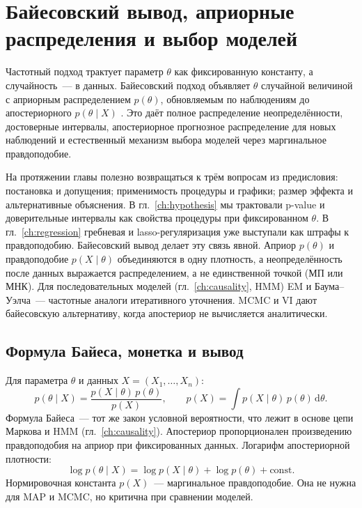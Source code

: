 \chapter{Байесовский вывод, априорные распределения и выбор моделей}
\label{ch:bayes}

Частотный подход трактует параметр $\theta$ как фиксированную константу, а случайность~--- в данных.
Байесовский подход объявляет $\theta$ случайной величиной с априорным распределением $p(\theta)$, обновляемым по наблюдениям до апостериорного $p(\theta\mid X)$ \citep{gelman2013,wasserman2004}.
Это даёт полное распределение неопределённости, достоверные интервалы, апостериорное прогнозное распределение для новых наблюдений и естественный механизм выбора моделей через маргинальное правдоподобие.


На протяжении главы полезно возвращаться к трём вопросам из предисловия: постановка и допущения; применимость процедуры и графики; размер эффекта и альтернативные объяснения. 
В гл.~\ref{ch:hypothesis} мы трактовали p-value и доверительные интервалы как свойства процедуры при фиксированном $\theta$. В гл.~\ref{ch:regression} гребневая и lasso-регуляризация уже выступали как штрафы к правдоподобию.
Байесовский вывод делает эту связь явной. Априор $p(\theta)$ и правдоподобие $p(X\mid\theta)$ объединяются в одну плотность, а неопределённость после данных выражается распределением, а не единственной точкой (МП или МНК).
Для последовательных моделей (гл.~\ref{ch:causality}, HMM) EM и Баума--Уэлча~--- частотные аналоги итеративного уточнения. MCMC и VI дают байесовскую альтернативу, когда апостериор не вычисляется аналитически.

\section{Формула Байеса, монетка и вывод}

Для параметра $\theta$ и данных $X=(X_1,\ldots,X_n)$: \[ p(\theta\mid X)=\frac{p(X\mid\theta)\,p(\theta)}{p(X)}, \qquad p(X)=\int p(X\mid\theta)\,p(\theta)\,\mathrm{d}\theta.
\] Формула Байеса~--- тот же закон условной вероятности, что лежит в основе цепи Маркова и HMM (гл.~\ref{ch:causality}). Апостериор пропорционален произведению правдоподобия на априор при фиксированных данных.
Логарифм апостериорной плотности: \[ \log p(\theta\mid X)=\log p(X\mid\theta)+\log p(\theta)+\mathrm{const}.
\] Нормировочная константа $p(X)$~--- маргинальное правдоподобие. Она не нужна для MAP и MCMC, но критична при сравнении моделей.

